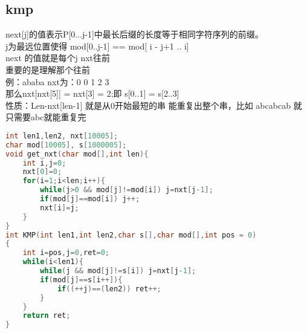 \subsection{kmp}
	next[j]的值表示P[0...j-1]中最长后缀的长度等于相同字符序列的前缀。\\
		j为最远位置使得   mod[0..j-1] == mod[ i - j+1 .. i]\\
	next 的值就是每个j  nxt往前\\
	重要的是理解那个往前  \\
		例：ababa nxt为：0 0 1 2 3\\ 
		那么nxt[nxt[5]] = nxt[3] = 2;即 s[0..1] = s[2..3]\\
	
	性质：Len-nxt[len-1] 就是从0开始最短的串 能重复出整个串，比如 abcabcab  就只需要abc就能重复完\\
	
		\begin{lstlisting}[language=c++]
int len1,len2, nxt[10005];
char mod[10005], s[1000005];
void get_nxt(char mod[],int len){ 
	int i,j=0;
	nxt[0]=0;
	for(i=1;i<len;i++){
		while(j>0 && mod[j]!=mod[i]) j=nxt[j-1]; 
		if(mod[j]==mod[i]) j++;
		nxt[i]=j;
	}
}
int KMP(int len1,int len2,char s[],char mod[],int pos = 0)
{
	int i=pos,j=0,ret=0;
	while(i<len1){
		while(j && mod[j]!=s[i]) j=nxt[j-1];
		if(mod[j]==s[i++]){
			if((++j)==(len2)) ret++;
		}
	}
	return ret;
}
		\end{lstlisting}